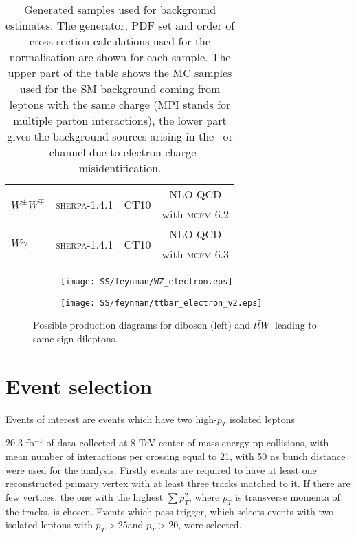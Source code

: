 \begin{table}[ht]
\begin{center}
\begin{tabular}{l|c|c|c}
\multirow{2}{*}{$W^{\pm}W^{\mp}$} & \multirow{2}{*}{{\scshape sherpa-1.4.1}} & \multirow{2}{*}{CT10}& NLO QCD \\
& &  & with {\scshape mcfm-6.2}\\
\hline
\multirow{2}{*}{$W\gamma$} & \multirow{2}{*}{{\scshape sherpa}-1.4.1} & \multirow{2}{*}{CT10}& NLO QCD\\
& &  & with {\scshape mcfm-6.3}\\
\hline
\end{tabular}
\end{center}
  \caption{Generated samples used for background estimates. The generator, PDF set and order of cross-section calculations used for the normalisation
  are shown for each sample.
  The upper part of the table shows the MC samples used for the SM background coming from leptons with the same charge (MPI stands for multiple parton interactions), the lower part gives the background sources arising in the \ee\ or \emu\ channel due to electron charge misidentification.}
\label{tab:MC_cross}
\end{table}

\begin{figure}

\begin{subfigure}{.5\textwidth}
  \centering
  \texttt{[image: SS/feynman/WZ\_electron.eps]}
\end{subfigure}%
\begin{subfigure}{.5\textwidth}
  \centering
  \texttt{[image: SS/feynman/ttbar\_electron\_v2.eps]}
\end{subfigure}

\caption{Possible production diagrams for diboson (left) and $t\bar{t} W$ leading to same-sign dileptons. }
  \label{fig:precHitFracPerTrack}
\end{figure}


\section{Event selection}


Events of interest are events which have two high-$p_T$ isolated leptons \toFix

20.3 fb$^{-1}$ of data collected at 8 TeV center of mass energy pp collisions, with mean number of interactions per crossing equal to 21, 
with 50 ns bunch distance were used for the analysis.
Firstly events are required to have at least one reconstructed primary vertex with at least three tracks matched to it. If there are few vertices, the one with the highest
$\sum p^2_T$, where $p_T$ is transverse momenta of the tracks, is chosen.
Events which pass \toFix trigger, which selects events with two isolated \toFix leptons with $p_{T}>25$\toFix and $p_{T}>20$\toFix, were selected.

